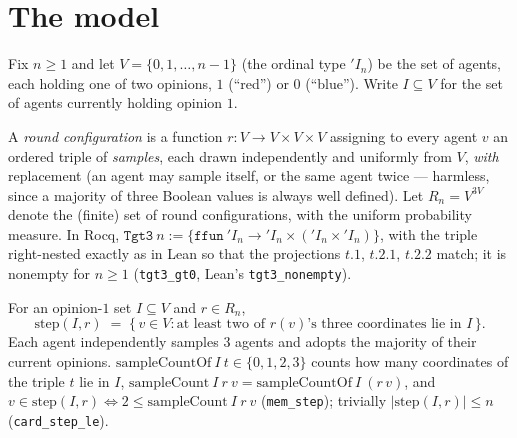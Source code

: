 \section{The model}\label{mj:sec:model}

Fix $n \ge 1$ and let $V = \{0,1,\dots,n-1\}$ (the ordinal type $'I_n$) be
the set of agents, each holding one of two opinions, $1$ (``red'') or $0$
(``blue''). Write $I \subseteq V$ for the set of agents currently holding
opinion $1$.

\begin{definition}\label{mj:round}
  \rocqok
  A \emph{round configuration} is a function $r \colon V \to V \times V
  \times V$ assigning to every agent $v$ an ordered triple of \emph{samples},
  each drawn independently and uniformly from $V$, \emph{with} replacement
  (an agent may sample itself, or the same agent twice --- harmless, since a
  majority of three Boolean values is always well defined). Let
  $R_n = V^{3V}$ denote the (finite) set of round configurations, with the
  uniform probability measure. In Rocq,
  $\texttt{Tgt3}\ n := \{\texttt{ffun}\ 'I_n \to 'I_n \times ('I_n \times 'I_n)\}$,
  with the triple right-nested exactly as in Lean so that the projections
  $t.1$, $t.2.1$, $t.2.2$ match; it is nonempty for $n \ge 1$
  (\texttt{tgt3\_gt0}, Lean's \texttt{tgt3\_nonempty}).
\end{definition}

\begin{definition}\label{mj:step}
  \rocqok
  For an opinion-$1$ set $I \subseteq V$ and $r \in R_n$,
  \[
    \mathrm{step}(I,r) \;=\; \{\, v \in V : \text{at least two of } r(v)\text{'s three
    coordinates lie in } I \,\}.
  \]
  Each agent independently samples $3$ agents and adopts the majority of
  their current opinions. $\mathrm{sampleCountOf}\ I\ t \in \{0,1,2,3\}$
  counts how many coordinates of the triple $t$ lie in $I$,
  $\mathrm{sampleCount}\ I\ r\ v = \mathrm{sampleCountOf}\ I\ (r\,v)$, and
  $v \in \mathrm{step}(I,r) \iff 2 \le \mathrm{sampleCount}\ I\ r\ v$
  (\texttt{mem\_step}); trivially $|\mathrm{step}(I,r)| \le n$
  (\texttt{card\_step\_le}).
\end{definition}

